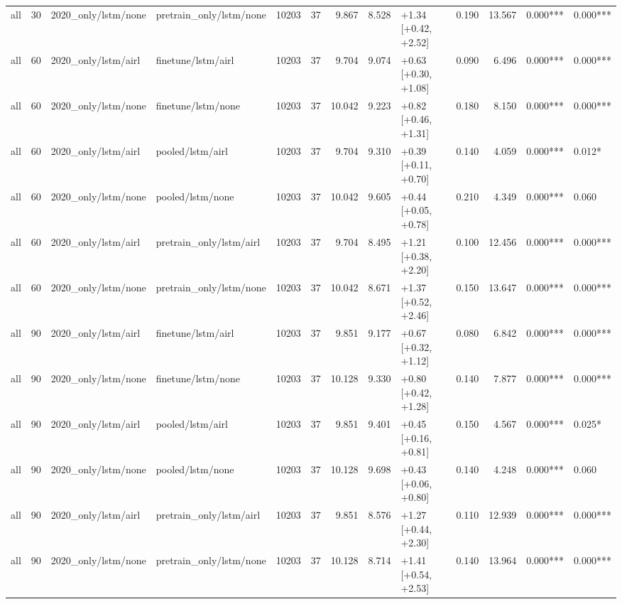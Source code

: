 \begin{tabular}{lrllrrrrlrrll}
all & 30 & 2020_only/lstm/none & pretrain_only/lstm/none & 10203 & 37 & 9.867 & 8.528 & +1.34 [+0.42, +2.52] & 0.190 & 13.567 & 0.000*** & 0.000*** \\
all & 60 & 2020_only/lstm/airl & finetune/lstm/airl & 10203 & 37 & 9.704 & 9.074 & +0.63 [+0.30, +1.08] & 0.090 & 6.496 & 0.000*** & 0.000*** \\
all & 60 & 2020_only/lstm/none & finetune/lstm/none & 10203 & 37 & 10.042 & 9.223 & +0.82 [+0.46, +1.31] & 0.180 & 8.150 & 0.000*** & 0.000*** \\
all & 60 & 2020_only/lstm/airl & pooled/lstm/airl & 10203 & 37 & 9.704 & 9.310 & +0.39 [+0.11, +0.70] & 0.140 & 4.059 & 0.000*** & 0.012* \\
all & 60 & 2020_only/lstm/none & pooled/lstm/none & 10203 & 37 & 10.042 & 9.605 & +0.44 [+0.05, +0.78] & 0.210 & 4.349 & 0.000*** & 0.060 \\
all & 60 & 2020_only/lstm/airl & pretrain_only/lstm/airl & 10203 & 37 & 9.704 & 8.495 & +1.21 [+0.38, +2.20] & 0.100 & 12.456 & 0.000*** & 0.000*** \\
all & 60 & 2020_only/lstm/none & pretrain_only/lstm/none & 10203 & 37 & 10.042 & 8.671 & +1.37 [+0.52, +2.46] & 0.150 & 13.647 & 0.000*** & 0.000*** \\
all & 90 & 2020_only/lstm/airl & finetune/lstm/airl & 10203 & 37 & 9.851 & 9.177 & +0.67 [+0.32, +1.12] & 0.080 & 6.842 & 0.000*** & 0.000*** \\
all & 90 & 2020_only/lstm/none & finetune/lstm/none & 10203 & 37 & 10.128 & 9.330 & +0.80 [+0.42, +1.28] & 0.140 & 7.877 & 0.000*** & 0.000*** \\
all & 90 & 2020_only/lstm/airl & pooled/lstm/airl & 10203 & 37 & 9.851 & 9.401 & +0.45 [+0.16, +0.81] & 0.150 & 4.567 & 0.000*** & 0.025* \\
all & 90 & 2020_only/lstm/none & pooled/lstm/none & 10203 & 37 & 10.128 & 9.698 & +0.43 [+0.06, +0.80] & 0.140 & 4.248 & 0.000*** & 0.060 \\
all & 90 & 2020_only/lstm/airl & pretrain_only/lstm/airl & 10203 & 37 & 9.851 & 8.576 & +1.27 [+0.44, +2.30] & 0.110 & 12.939 & 0.000*** & 0.000*** \\
all & 90 & 2020_only/lstm/none & pretrain_only/lstm/none & 10203 & 37 & 10.128 & 8.714 & +1.41 [+0.54, +2.53] & 0.140 & 13.964 & 0.000*** & 0.000*** \\
\bottomrule
\end{tabular}
